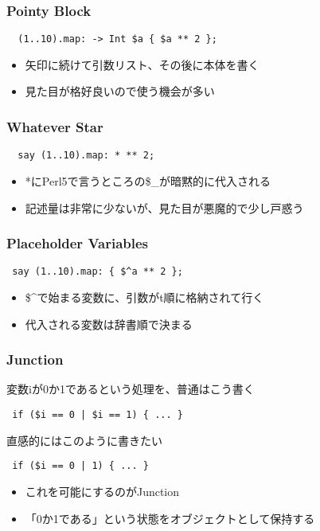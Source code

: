 \documentclass[14pt,dvipdfm,trans]{beamer}
\begin{document}
\begin{frame}[fragile]
 \frametitle{Pointy Block}
 \begin{lstlisting}
  (1..10).map: -> Int $a { $a ** 2 };
 \end{lstlisting}
 \begin{itemize}
  \item 矢印に続けて引数リスト、その後に本体を書く
  \item 見た目が格好良いので使う機会が多い
 \end{itemize}
\end{frame}
 
\begin{frame}[fragile]
 \frametitle{Whatever Star}
 \begin{lstlisting}
  say (1..10).map: * ** 2;
 \end{lstlisting}

 \begin{itemize}
  \item *にPerl5で言うところの\$\_が暗黙的に代入される
  \item 記述量は非常に少ないが、見た目が悪魔的で少し戸惑う
 \end{itemize}
\end{frame}

\begin{frame}[fragile]
 \frametitle{Placeholder Variables}
 \begin{lstlisting}
 say (1..10).map: { $^a ** 2 };
 \end{lstlisting}

 \begin{itemize}
  \item \$\^{}で始まる変数に、引数がt順に格納されて行く
  \item 代入される変数は辞書順で決まる
 \end{itemize}
\end{frame}

\begin{frame}[fragile]
 \frametitle{Junction}
変数iが0か1であるという処理を、普通はこう書く
\begin{lstlisting}
 if ($i == 0 | $i == 1) { ... }
\end{lstlisting}

直感的にはこのように書きたい
\begin{lstlisting}
 if ($i == 0 | 1) { ... }
\end{lstlisting}

\begin{itemize}
 \item これを可能にするのがJunction
 \item 「0か1である」という状態をオブジェクトとして保持する
\end{itemize}
\end{frame}
\end{document}
